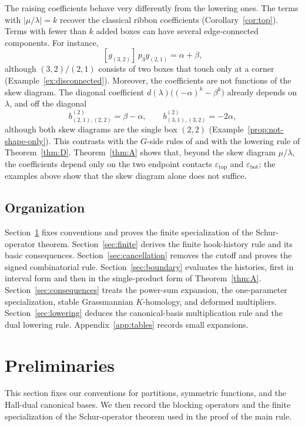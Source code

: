 \documentclass[11pt]{amsart}
\numberwithin{equation}{section}
\theoremstyle{definition}
\theoremstyle{remark}
\begin{document}
The raising coefficients behave very differently from the lowering ones. The terms with $|\mu/\lambda|=k$ recover the classical ribbon
coefficients (Corollary~\ref{cor:top}). Terms with fewer than
$k$ added boxes can have several edge-connected components. For instance,
\begin{equation}\label{eq:intro-disconnected}
 [g_{(3,2)}]\,p_3g_{(2,1)}=\alpha+\beta ,
\end{equation}
although $(3,2)/(2,1)$ consists of two boxes that touch only at a corner
(Example~\ref{ex:disconnected}). Moreover, the coefficients are not
functions of the skew diagram. The diagonal coefficient
$d(\lambda)\bigl((-\alpha)^k-\beta^k\bigr)$ already depends on $\lambda$, and
off the diagonal
\begin{equation}\label{eq:intro-counterexample}
 b^{(2)}_{(2,1),(2,2)}=\beta-\alpha,
 \qquad
 b^{(2)}_{(3,1),(3,2)}=-2\alpha ,
\end{equation}
although both skew diagrams are the single box $(2,2)$ (Example~\ref{prop:not-shape-only}). This contrasts with the $G$-side
rules of \cite{NHST,Kundu} and with the lowering rule of
Theorem~\ref{thm:D}. Theorem~\ref{thm:A} shows that, beyond the skew diagram $\mu/\lambda$, the
coefficients depend only on the two endpoint contacts
$\varepsilon_{\mathrm{top}}$ and $\varepsilon_{\mathrm{bot}}$; the examples
above show that the skew diagram alone does not suffice.

\subsection{Organization}

Section~\ref{sec:preliminaries} fixes conventions and proves the finite
specialization of the Schur-operator theorem.
Section~\ref{sec:finite} derives the finite hook-history rule and its
basic consequences. Section~\ref{sec:cancellation} removes the cutoff
and proves the signed combinatorial rule.
Section~\ref{sec:boundary} evaluates the histories, first in interval
form and then in the single-product form of Theorem~\ref{thm:A}.
Section~\ref{sec:consequences} treats the power-sum expansion, the
one-parameter specialization, stable Grassmannian $K$-homology, and
deformed multipliers. Section~\ref{sec:lowering} deduces the
canonical-basis multiplication rule and the dual lowering rule.
Appendix~\ref{app:tables} records small expansions.

\section{Preliminaries}\label{sec:preliminaries}
This section fixes our conventions for partitions, symmetric functions,
and the Hall-dual canonical bases. We then record the blocking operators
and the finite specialization of the Schur-operator theorem used in the
proof of the main rule.
\end{document}
